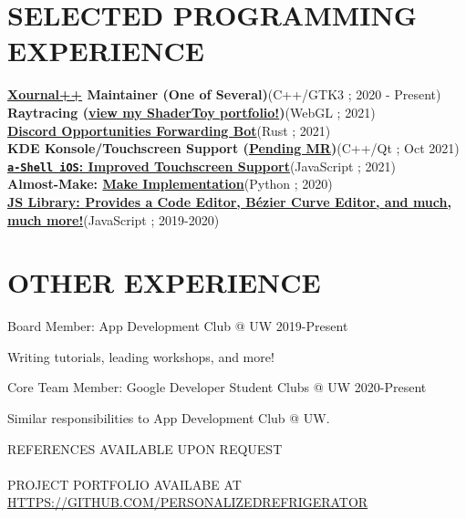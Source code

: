 \documentclass[12pt,letterpaper]{extarticle}
\begin{document}
  \section{SELECTED PROGRAMMING EXPERIENCE}
  \newcommand\prExpEntry[3]{\textbf{#1}\hfill (#2 ; #3) \\}
  \prExpEntry{\href{https://github.com/xournalpp/xournalpp}{Xournal++} Maintainer (One of Several)}{C++/GTK3}{2020 - Present}
  \prExpEntry{Raytracing (\href{shadertoy.com/user/personalizedrefrigerator}{view my ShaderToy portfolio!})}{WebGL}{2021}
  \prExpEntry{\href{https://github.com/UWAppDev/opportunities-forwarding-bot}{Discord Opportunities Forwarding Bot}}{Rust}{2021}
  \prExpEntry{KDE Konsole/Touchscreen Support (\href{https://invent.kde.org/utilities/konsole/-/merge_requests/516}{Pending MR})}{C++/Qt}{Oct 2021}
  \prExpEntry{\href{https://github.com/holzschu/a-shell/pull/246}{\texttt{a-Shell iOS}: Improved Touchscreen Support}}{JavaScript}{2021}
  \prExpEntry{Almost-Make: \href{https://github.com/personalizedrefrigerator/AlmostMake}{Make Implementation}}{Python}{2020}
  \prExpEntry{\href{https://github.com/personalizedrefrigerator/LibJS}{{\footnotesize JS Library:} {\small Provides a Code Editor, Bézier Curve Editor,} {\tiny and much, much more!}}}{JavaScript}{2019-2020}

  \section{OTHER EXPERIENCE}
  Board Member: App Development Club @ UW \hfill 2019-Present
  \begin{addmargin}[2em]{2em}
    Writing tutorials, leading workshops, and more!
  \end{addmargin}
  Core Team Member: Google Developer Student Clubs @ UW \hfill 2020-Present
  \begin{addmargin}[2em]{2em}
    Similar responsibilities to App Development Club @ UW.
  \end{addmargin}

  \begin{center}
    REFERENCES AVAILABLE UPON REQUEST\\\phantom{;}\\
    PROJECT PORTFOLIO AVAILABE AT \url{HTTPS://GITHUB.COM/PERSONALIZEDREFRIGERATOR}
  \end{center}
\end{document}
